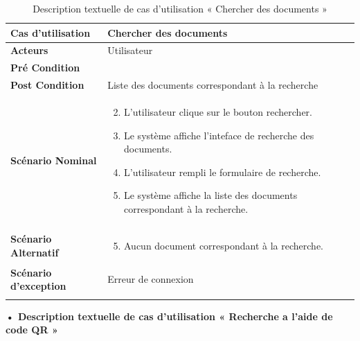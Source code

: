 \begin{longtable}{|p{5cm}|p{10cm}|}
\hline
\textbf{Cas d'utilisation}&Chercher des documents\\
\hline
\textbf{Acteurs}&Utilisateur\\
\hline
\textbf{Pré Condition}&\\
\hline
\textbf{Post Condition}&Liste des documents correspondant à la recherche\\
\hline
\textbf{Scénario Nominal}&
\vspace{-\baselineskip}
\begin{enumerate}
    \setcounter{enumi}{1}
    \item L'utilisateur clique sur le bouton rechercher.
    \item Le système affiche l'inteface de recherche des documents.
    \item L'utilisateur rempli le formulaire de recherche.
    \item Le système affiche la liste des documents correspondant à la recherche.
\end{enumerate}\\
\hline
\textbf{Scénario Alternatif}&
\vspace{-\baselineskip}
\begin{enumerate}
    \setcounter{enumi}{4}
    \item Aucun document correspondant à la recherche.
\end{enumerate}\\
\hline
\textbf{Scénario d'exception}&Erreur de connexion\\
\hline
\caption{Description textuelle de cas d'utilisation « Chercher des documents »}
\label{tab:DescriptionTextuelleDeCasDUtilisationChercherDesDocuments}
\end{longtable}

\textbf{•	Description textuelle de cas d'utilisation « Recherche a l'aide de code QR »}

